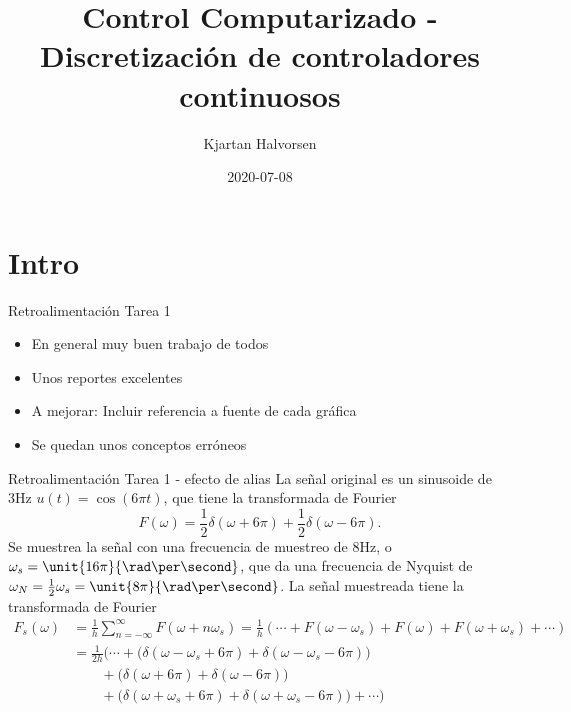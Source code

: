 \documentclass[presentation,aspectratio=1610]{beamer}
\author{Kjartan Halvorsen}
\date{2020-07-08}
\title{Control Computarizado - Discretización de controladores continuosos}
\begin{document}
\maketitle


\section{Intro}
\label{sec:org82b864f}
\begin{frame}[label={sec:orgac69422}]{Retroalimentación Tarea 1}
\begin{itemize}
\item En general \alert{muy buen trabajo} de todos
\item Unos \alert{reportes excelentes}
\item A mejorar: Incluir \alert{referencia a fuente} de cada gráfica
\item Se quedan unos conceptos erróneos
\end{itemize}
\end{frame}

\begin{frame}[label={sec:org24064f8}]{Retroalimentación Tarea 1 - efecto de alias}
 La señal original es un sinusoide de 3Hz \(u(t) = \cos(6\pi t)\),  que tiene la transformada de Fourier 
\[ F(\omega) = \frac{1}{2}\delta(\omega + 6\pi) + \frac{1}{2}\delta(\omega - 6\pi).\]
Se muestrea la señal con  una frecuencia de muestreo de 8Hz, o \(\omega_s = \unit{16\pi}{\rad\per\second}\), que da una frecuencia de Nyquist de \(\omega_N = \frac{1}{2} \omega_s = \unit{8\pi}{\rad\per\second}\). La señal muestreada tiene la transformada de Fourier
  \begin{align*}
   F_s(\omega) &= \frac{1}{h} \sum_{n=-\infty}^\infty F(\omega + n\omega_s) = \frac{1}{h} \left( \cdots + F(\omega - \omega_s) + F(\omega) + F(\omega + \omega_s) + \cdots \right)\\
&= \frac{1}{2h}\Big( \cdots + \big(\delta(\omega -\omega_s + 6\pi) + \delta(\omega -\omega_s - 6\pi)\big)\\& \qquad + \big(\delta(\omega + 6\pi) + \delta(\omega - 6\pi)\big)\\ & \qquad + \big(\delta(\omega +\omega_s + 6\pi) + \delta(\omega +\omega_s - 6\pi)\big) + \cdots \Big)
\end{align*} 
\end{frame}
\end{document}
